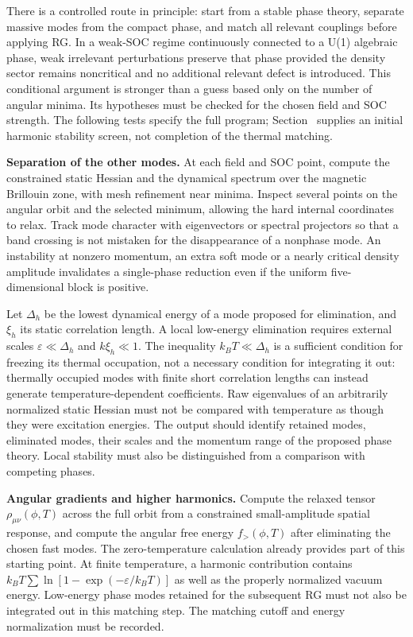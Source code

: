 There is a controlled route in principle: start from a stable phase
theory, separate massive modes from the compact phase, and match all
relevant couplings before applying RG. In a weak-SOC regime continuously
connected to a U(1) algebraic phase, weak irrelevant perturbations
preserve that phase provided the density sector remains noncritical and
no additional relevant defect is introduced. This conditional argument
is stronger than a guess based only on the number of angular minima. Its
hypotheses must be checked for the chosen field and SOC strength. The
following tests specify the full program;
Section~ supplies an initial
harmonic stability screen, not completion of the thermal matching.

\textbf{Separation of the other modes.} At each field and SOC point,
compute the constrained static Hessian and the dynamical spectrum over
the magnetic Brillouin zone, with mesh refinement near minima. Inspect
several points on the angular orbit and the selected minimum, allowing
the hard internal coordinates to relax. Track mode character with
eigenvectors or spectral projectors so that a band crossing is not
mistaken for the disappearance of a nonphase mode. An instability at
nonzero momentum, an extra soft mode or a nearly critical density
amplitude invalidates a single-phase reduction even if the uniform
five-dimensional block is positive.

Let \(\Delta_h\) be the lowest dynamical energy of a mode proposed for
elimination, and \(\xi_h\) its static correlation length. A local
low-energy elimination requires external scales
\(\varepsilon\ll\Delta_h\) and \(k\xi_h\ll1\). The inequality
\(k_BT\ll\Delta_h\) is a sufficient condition for freezing its thermal
occupation, not a necessary condition for integrating it out: thermally
occupied modes with finite short correlation lengths can instead
generate temperature-dependent coefficients. Raw eigenvalues of an
arbitrarily normalized static Hessian must not be compared with
temperature as though they were excitation energies. The output should
identify retained modes, eliminated modes, their scales and the momentum
range of the proposed phase theory. Local stability must also be
distinguished from a comparison with competing phases.

\textbf{Angular gradients and higher harmonics.} Compute the relaxed
tensor \(\rho_{\mu\nu}(\phi,T)\) across the full orbit from a
constrained small-amplitude spatial response, and compute the angular
free energy \(f_>(\phi,T)\) after eliminating the chosen fast modes. The
zero-temperature calculation already provides part of this starting
point. At finite temperature, a harmonic contribution contains
\(k_BT\sum\ln[1-\exp(-\varepsilon/k_BT)]\) as well as the properly
normalized vacuum energy. Low-energy phase modes retained for the
subsequent RG must not also be integrated out in this matching step. The
matching cutoff and energy normalization must be recorded.

